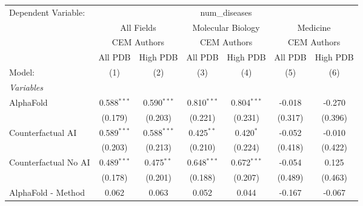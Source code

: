 \begingroup
\centering
\begin{tabular}{lcccccc}
   \tabularnewline \midrule \midrule
   Dependent Variable: & \multicolumn{6}{c}{num\_diseases}\\
 & \multicolumn{2}{c}{All Fields} & \multicolumn{2}{c}{Molecular Biology} & \multicolumn{2}{c}{Medicine} \\
\cmidrule(lr){2-3} \cmidrule(lr){4-5} \cmidrule(lr){6-7}
 & \multicolumn{2}{c}{CEM Authors} & \multicolumn{2}{c}{CEM Authors} & \multicolumn{2}{c}{CEM Authors} \\
\cmidrule(lr){2-3} \cmidrule(lr){4-5} \cmidrule(lr){6-7}
 & \multicolumn{1}{c}{All PDB} & \multicolumn{1}{c}{High PDB} & \multicolumn{1}{c}{All PDB} & \multicolumn{1}{c}{High PDB} & \multicolumn{1}{c}{All PDB} & \multicolumn{1}{c}{High PDB} \\
\cmidrule(lr){2-2} \cmidrule(lr){3-3} \cmidrule(lr){4-4} \cmidrule(lr){5-5} \cmidrule(lr){6-6} \cmidrule(lr){7-7}
   Model:                                                     & (1)            & (2)            & (3)           & (4)           & (5)           & (6)\\  
   \midrule
   \emph{Variables}\\
   AlphaFold                                                  & 0.588$^{***}$  & 0.590$^{***}$  & 0.810$^{***}$ & 0.804$^{***}$ & -0.018        & -0.270\\   
                                                              & (0.179)        & (0.203)        & (0.221)       & (0.231)       & (0.317)       & (0.396)\\   
   Counterfactual AI                                          & 0.589$^{***}$  & 0.588$^{***}$  & 0.425$^{**}$  & 0.420$^{*}$   & -0.052        & -0.010\\   
                                                              & (0.203)        & (0.213)        & (0.210)       & (0.224)       & (0.418)       & (0.422)\\   
   Counterfactual No AI                                       & 0.489$^{***}$  & 0.475$^{**}$   & 0.648$^{***}$ & 0.672$^{***}$ & -0.054        & 0.125\\   
                                                              & (0.178)        & (0.201)        & (0.188)       & (0.207)       & (0.489)       & (0.463)\\   
   AlphaFold - Method                                         & 0.062          & 0.063          & 0.052         & 0.044         & -0.167        & -0.067\\   

\end{tabular}
